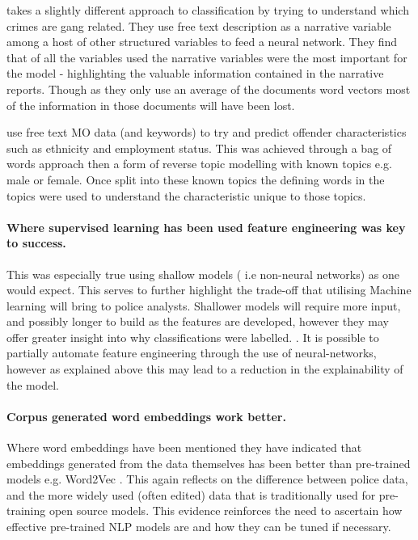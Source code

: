 \textcite{seo2018partially} takes a slightly different approach to classification by trying to understand which crimes are gang related. They use free text description as a narrative variable among a host of other structured variables to feed a neural network. They find that of all the variables used the narrative variables were the most important for the model - highlighting the valuable information contained in the narrative reports. Though as they only use an average of the documents word vectors most of the information in those documents will have been lost.

\textcite{bache2010language}  use free text MO data (and keywords) to try and predict offender characteristics such as ethnicity and employment status. This was achieved through a bag of words approach then a form of reverse topic modelling with known topics e.g. male or female. Once split into these known topics the defining words in the topics were used to understand the characteristic unique to those topics. 

\paragraph{Where supervised learning has been used feature engineering was key to success.} This was especially true using shallow models ( i.e non-neural networks) as one would expect. This serves to further highlight the trade-off that utilising Machine learning will bring to police analysts. Shallower models will require more input, and possibly longer to build as the features are developed, however they may offer greater insight into why classifications were labelled. \parencite{vandePutte2009425, Bachenko200841,Ku201318}. It is possible to partially automate feature engineering through the use of neural-networks, however as explained above this may lead to a reduction in the explainability of the model.

\paragraph{Corpus generated word embeddings work better.} Where word embeddings have been mentioned they have indicated that embeddings generated from the data themselves has been better than pre-trained models e.g. Word2Vec \parencite{Schraagen201979,Haleem20192279}. This again reflects on the difference between police data, and the more widely used (often edited) data that is traditionally used for pre-training open source models. This evidence reinforces the need to ascertain how effective pre-trained NLP models are and how they can be tuned if necessary.




